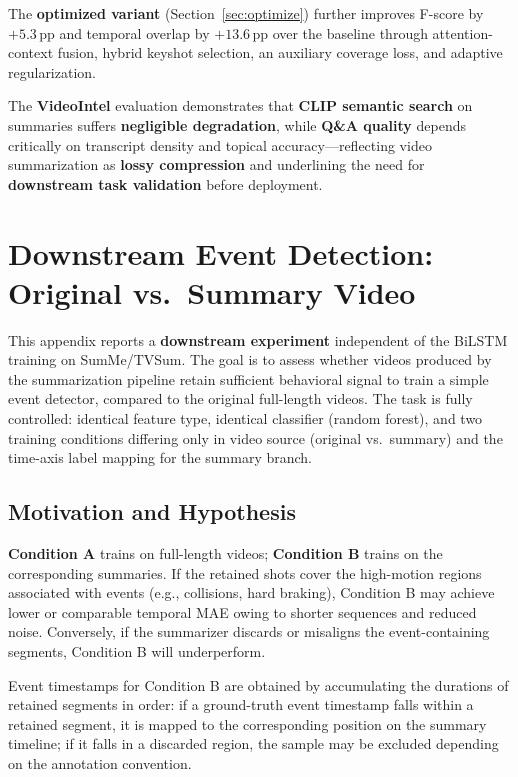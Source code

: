 \documentclass[10pt,conference]{IEEEtran}
\begin{document}
The \textbf{optimized variant} (Section~\ref{sec:optimize}) further improves
F-score by $+5.3$\,pp and temporal overlap by $+13.6$\,pp over the baseline
through attention-context fusion, hybrid keyshot selection, an auxiliary
coverage loss, and adaptive regularization.

The \textbf{VideoIntel} evaluation demonstrates that \textbf{CLIP semantic
search} on summaries suffers \textbf{negligible degradation}, while
\textbf{Q\&A quality} depends critically on transcript density and topical
accuracy---reflecting video summarization as \textbf{lossy compression} and
underlining the need for \textbf{downstream task validation} before deployment.

\appendix

\section{Downstream Event Detection: Original vs.\ Summary Video}
\label{app:event_detection}

This appendix reports a \textbf{downstream experiment} independent of the
BiLSTM training on SumMe/TVSum. The goal is to assess whether videos produced
by the summarization pipeline retain sufficient behavioral signal to train a
simple event detector, compared to the original full-length videos. The task
is fully controlled: identical feature type, identical classifier (random
forest), and two training conditions differing only in video source (original
vs.\ summary) and the time-axis label mapping for the summary branch.

\subsection{Motivation and Hypothesis}

\textbf{Condition A} trains on full-length videos; \textbf{Condition B} trains
on the corresponding summaries. If the retained shots cover the high-motion
regions associated with events (e.g., collisions, hard braking), Condition B
may achieve lower or comparable temporal MAE owing to shorter sequences and
reduced noise. Conversely, if the summarizer discards or misaligns the
event-containing segments, Condition B will underperform.

Event timestamps for Condition B are obtained by accumulating the durations of
retained segments in order: if a ground-truth event timestamp falls within a
retained segment, it is mapped to the corresponding position on the summary
timeline; if it falls in a discarded region, the sample may be excluded
depending on the annotation convention.
\end{document}
